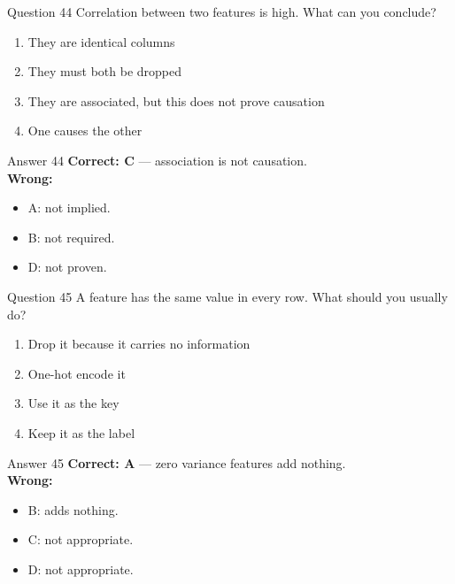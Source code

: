 \documentclass[aspectratio=169,11pt]{beamer}
\begin{document}
\begin{frame}{Question 44}
Correlation between two features is high. What can you conclude?
\begin{enumerate}[label=\Alph*.]
\item They are identical columns
\item They must both be dropped
\item They are associated, but this does not prove causation
\item One causes the other
\end{enumerate}
\end{frame}
\begin{frame}{Answer 44}
\textbf{Correct: C} --- association is not causation.\\
\vspace{0.5em}
\textbf{Wrong:}
\begin{itemize}
\item A: not implied.
\item B: not required.
\item D: not proven.
\end{itemize}
\end{frame}

\begin{frame}{Question 45}
A feature has the same value in every row. What should you usually do?
\begin{enumerate}[label=\Alph*.]
\item Drop it because it carries no information
\item One-hot encode it
\item Use it as the key
\item Keep it as the label
\end{enumerate}
\end{frame}
\begin{frame}{Answer 45}
\textbf{Correct: A} --- zero variance features add nothing.\\
\vspace{0.5em}
\textbf{Wrong:}
\begin{itemize}
\item B: adds nothing.
\item C: not appropriate.
\item D: not appropriate.
\end{itemize}
\end{frame}
\end{document}

